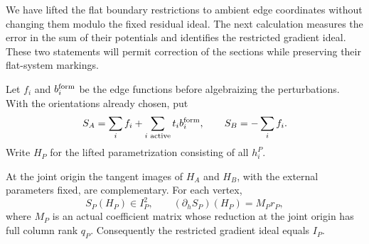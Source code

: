 We have lifted the flat boundary restrictions to ambient edge
coordinates without changing them modulo the fixed residual ideal.
The next calculation measures the error in the sum of their
potentials and identifies the restricted gradient ideal. These two
statements will permit correction of the sections while preserving
their flat-system markings.

Let $f_i$ and $b_i^{\rm form}$ be the edge functions before algebraizing
the perturbations.  With the orientations already chosen, put
\[
 S_A=\sum_i f_i+\sum_{i\text{ active}}t_i b_i^{\rm form},
 \qquad S_B=-\sum_i f_i.
\]
Write $H_P$ for the lifted parametrization consisting of all $h_i^P$.

\begin{lemma}
\label{lem:vertex-offshell-identities}
At the joint origin the tangent images of $H_A$ and $H_B$, with the
external parameters fixed, are complementary.  For each vertex,
\begin{equation}
\label{eq:vertex-square-and-gradient}
 S_P(H_P)\in I_P^2,
 \qquad (\partial_h S_P)(H_P)=M_P r_P,
\end{equation}
where $M_P$ is an actual coefficient matrix whose reduction at the
joint origin has full column rank $q_P$.  Consequently the restricted
gradient ideal equals $I_P$.
\end{lemma}

